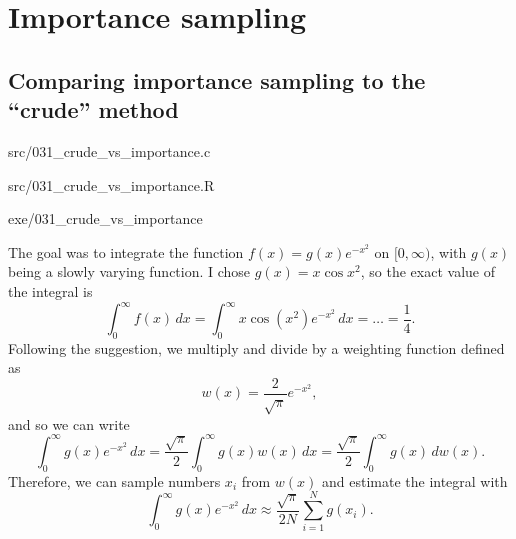 \chapter{Importance sampling}

\section{Comparing importance sampling to the \enquote{crude} method}%
\label{ex:031}

\begin{sourcefiles}
  \item[Source codes] src/031\_crude\_vs\_importance.c
  \item[Analysis scripts] src/031\_crude\_vs\_importance.R
  \item[Executables] exe/031\_crude\_vs\_importance
\end{sourcefiles}

The goal was to integrate the function $f(x) = g(x) e^{-x^{2}}$ on $[0,
\infty)$, with $g(x)$ being a slowly varying function. I chose $g(x) = x
\cos x^{2}$, so the exact value of the integral is
\begin{equation}
  \int_{0}^{\infty} f(x) \, dx = \int_{0}^{\infty} x \cos(x^2) e^{-x^{2}}\, dx =
  \dots = \frac{1}{4}.
\end{equation}
Following the suggestion, we multiply and divide by a weighting function defined
as
\begin{equation}
  w(x) = \frac{2}{\sqrt{\pi}} e^{-x^{2}},
\end{equation}
and so we can write
\begin{equation}
  \int_{0}^{\infty} g(x) e^{-x^{2}} \, dx = \frac{\sqrt{\pi}}{2}
  \int_{0}^{\infty} g(x) w(x) \, dx = \frac{\sqrt{\pi}}{2} \int_{0}^{\infty}
  g(x) \, dw(x).
\end{equation}
Therefore, we can sample numbers $x_i$ from $w(x)$ and estimate the integral
with
\begin{equation}
  \int_{0}^{\infty} g(x) e^{-x^{2}} \, dx \approx \frac{\sqrt{\pi}}{2N} \sum_{i
  = 1}^{N} g(x_i).
\end{equation}

